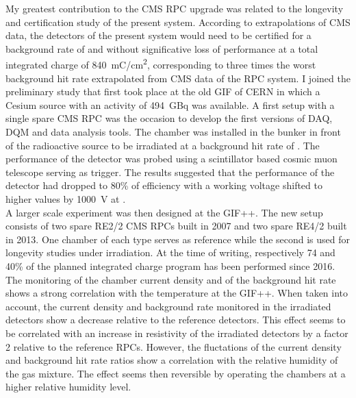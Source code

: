 	My greatest contribution to the CMS RPC upgrade was related to the longevity and certification study of the present system. According to extrapolations of CMS data, the detectors of the present system would need to be certified for a background rate of  and without significative loss of performance at a total integrated charge of \SI{840}{mC/cm^2}, corresponding to three times the worst background hit rate extrapolated from CMS data of the RPC system. I joined the preliminary study that first took place at the old \acl{GIF} of CERN in which a Cesium source with an activity of \SI{494}{GBq} was available. A first setup with a single spare CMS RPC was the occasion to develop the first versions of \acl{DAQ}, \acl{DQM} and data analysis tools. The chamber was installed in the bunker in front of the radioactive source to be irradiated at a background hit rate of . The performance of the detector was probed using a scintillator based cosmic muon telescope serving as trigger. The results suggested that the performance of the detector had dropped to 80\% of efficiency with a working voltage shifted to higher values by \SI{1000}{V} at .\\
	A larger scale experiment was then designed at the GIF++. The new setup consists of two spare RE2/2 CMS RPCs built in 2007 and two spare RE4/2 built in 2013. One chamber of each type serves as reference while the second is used for longevity studies under irradiation. At the time of writing, respectively 74 and 40\% of the planned integrated charge program has been performed since 2016. The monitoring of the chamber current density and of the background hit rate shows a strong correlation with the temperature at the GIF++. When taken into account, the current density and background rate monitored in the irradiated detectors show a decrease relative to the reference detectors. This effect seems to be correlated with an increase in resistivity of the irradiated detectors by a factor 2 relative to the reference RPCs. However, the fluctations of the current density and background hit rate ratios show a correlation with the relative humidity of the gas mixture. The effect seems then reversible by operating the chambers at a higher relative humidity level.\\
